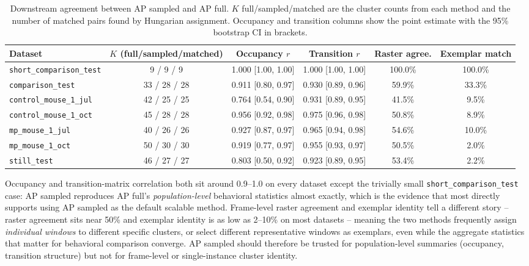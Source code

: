 \documentclass[11pt]{article}
\begin{document}
\begin{table}[h]
\centering
\caption{Downstream agreement between AP sampled and AP full. $K$ full/sampled/matched are the cluster counts from each method and the number of matched pairs found by Hungarian assignment. Occupancy and transition columns show the point estimate with the 95\% bootstrap CI in brackets.}
\label{tab:downstream}
\scriptsize
\setlength{\tabcolsep}{4pt}
\begin{tabular}{lccccc}
\toprule
Dataset & $K$ (full/sampled/matched) & Occupancy $r$ & Transition $r$ & Raster agree. & Exemplar match \\
\midrule
\texttt{short\_comparison\_test} & 9 / 9 / 9 & 1.000 [1.00, 1.00] & 1.000 [1.00, 1.00] & 100.0\% & 100.0\% \\
\texttt{comparison\_test} & 33 / 28 / 28 & 0.911 [0.80, 0.97] & 0.930 [0.89, 0.96] & 59.9\% & 33.3\% \\
\texttt{control\_mouse\_1\_jul} & 42 / 25 / 25 & 0.764 [0.54, 0.90] & 0.931 [0.89, 0.95] & 41.5\% & 9.5\% \\
\texttt{control\_mouse\_1\_oct} & 45 / 28 / 28 & 0.956 [0.92, 0.98] & 0.975 [0.96, 0.98] & 50.8\% & 8.9\% \\
\texttt{mp\_mouse\_1\_jul} & 40 / 26 / 26 & 0.927 [0.87, 0.97] & 0.965 [0.94, 0.98] & 54.6\% & 10.0\% \\
\texttt{mp\_mouse\_1\_oct} & 50 / 30 / 30 & 0.919 [0.77, 0.97] & 0.955 [0.93, 0.97] & 50.5\% & 2.0\% \\
\texttt{still\_test} & 46 / 27 / 27 & 0.803 [0.50, 0.92] & 0.923 [0.89, 0.95] & 53.4\% & 2.2\% \\
\bottomrule
\end{tabular}
\end{table}

Occupancy and transition-matrix correlation both sit around 0.9--1.0 on every dataset except the trivially small \texttt{short\_comparison\_test} case: AP sampled reproduces AP full's \emph{population-level} behavioral statistics almost exactly, which is the evidence that most directly supports using AP sampled as the default scalable method. Frame-level raster agreement and exemplar identity tell a different story -- raster agreement sits near 50\% and exemplar identity is as low as 2--10\% on most datasets -- meaning the two methods frequently assign \emph{individual windows} to different specific clusters, or select different representative windows as exemplars, even while the aggregate statistics that matter for behavioral comparison converge. AP sampled should therefore be trusted for population-level summaries (occupancy, transition structure) but not for frame-level or single-instance cluster identity.
\end{document}
